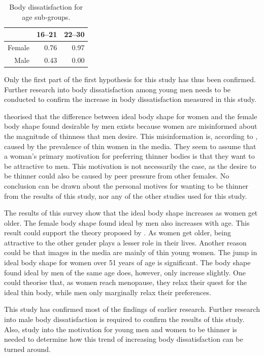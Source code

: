 \documentclass[a4paper, apacite, jou, 11pt]{apa6}
\begin{document}
\begin{table}[ht]
\centering
\begin{tabular}{rrr}
  \hline
 & 16--21 & 22--30 \\ 
  \hline
Female & 0.76 & 0.97 \\ 
  Male & 0.43 & 0.00 \\ 
   \hline
\end{tabular}
\caption{Body dissatisfaction for age sub-groups.} 
\label{age2}
\end{table}

Only the first part of the first hypothesis for this study has thus been confirmed. Further research into body dissatisfaction among young men needs to be conducted to confirm the increase in body dissatisfaction measured in this study.

 theorised that the difference between ideal body shape for women and the female body shape found desirable by men exists because women are misinformed about the magnitude of thinness that men desire. This misinformation is, according to , caused by the prevalence of thin women in the media. They seem to assume that a woman's primary motivation for preferring thinner bodies is that they want to be attractive to men. This motivation is not necessarily the case, as the desire to be thinner could also be caused by peer pressure from other females. No conclusion can be drawn about the personal motives for wanting to be thinner from the results of this study, nor any of the other studies used for this study.

The results of this survey show that the ideal body shape increases as women get older. The female body shape found ideal by men also increases with age. This result could support the theory proposed by . As women get older, being attractive to the other gender plays a lesser role in their lives. Another reason could be that images in the media are mainly of thin young women. The jump in ideal body shape for women over 51 years of age is significant. The body shape found ideal by men of the same age does, however, only increase slightly. One could theorise that, as women reach menopause, they relax their quest for the ideal thin body, while men only marginally relax their preferences.

This study has confirmed most of the findings of earlier research. Further research into male body dissatisfaction is required to confirm the results of this study. Also, study into the motivation for young men and women to be thinner is needed to determine how this trend of increasing body dissatisfaction can be turned around.



\end{document}
